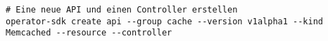 \begin{verbatim}
# Eine neue API und einen Controller erstellen
operator-sdk create api --group cache --version v1alpha1 --kind Memcached --resource --controller
\end{verbatim}